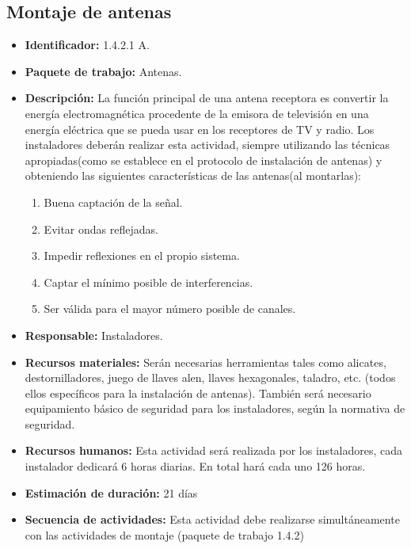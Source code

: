 \subsection{Montaje de antenas}
\begin{itemize}
\item \textbf{Identificador: }1.4.2.1 A.
\item \textbf{Paquete de trabajo: }Antenas.
\item \textbf{Descripción: }La función principal de una antena receptora es convertir la energía electromagnética procedente de la emisora de televisión en una energía eléctrica que se pueda usar en los receptores de TV y radio. Los instaladores deberán realizar esta actividad, siempre utilizando las técnicas apropiadas(como se establece en el protocolo de instalación de antenas) y obteniendo las siguientes características de las antenas(al montarlas):
\begin{enumerate}
\item Buena captación de la señal.
\item Evitar ondas reflejadas.
\item Impedir reflexiones en el propio sistema.
\item Captar el mínimo posible de interferencias. 
\item Ser válida para el mayor número posible de canales.
\end{enumerate}
\item \textbf{Responsable: }Instaladores.
\item \textbf{Recursos materiales: }Serán necesarias herramientas tales como alicates, destornilladores, juego de llaves alen, llaves hexagonales, taladro, etc. (todos ellos específicos para la instalación de antenas). También será necesario equipamiento básico de seguridad para los instaladores, según la normativa de seguridad.
\item \textbf{Recursos humanos: }Esta actividad será realizada por los instaladores, cada instalador dedicará 6 horas diarias. En total hará cada uno 126 horas.
\item \textbf{Estimación de duración: }21 días
\item \textbf{Secuencia de actividades: }Esta actividad debe realizarse simultáneamente con las actividades de montaje (paquete de trabajo 1.4.2)
\end{itemize}

